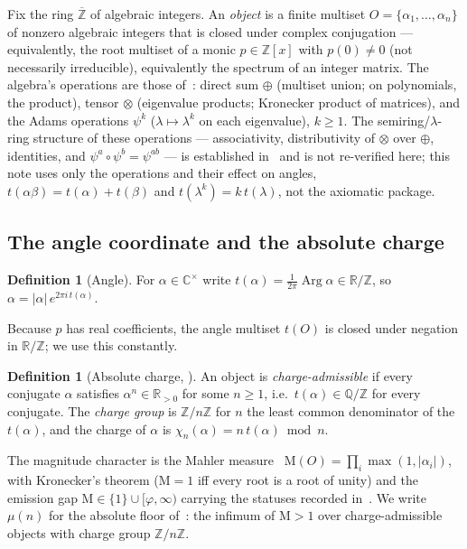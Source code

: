 \documentclass[11pt]{article}
\theoremstyle{plain}
\theoremstyle{definition}
\newtheorem{definition}[theorem]{Definition}
\theoremstyle{remark}
\newcommand{\Q}{\mathbb{Q}}
\newcommand{\Z}{\mathbb{Z}}
\newcommand{\R}{\mathbb{R}}
\newcommand{\Mah}{\mathrm{M}}
\DeclareMathOperator{\Arg}{Arg}
\newcommand{\tors}{\Q/\Z}
\begin{document}
Fix the ring $\overline{\Z}$ of algebraic integers. An \emph{object} is a finite
multiset $O=\{\alpha_1,\dots,\alpha_n\}$ of nonzero algebraic integers that is
closed under complex conjugation --- equivalently, the root multiset of a monic
$p\in\Z[x]$ with $p(0)\neq0$ (not necessarily irreducible), equivalently the
spectrum of an integer matrix. The algebra's operations are those of~\cite{CMC}:
direct sum $\oplus$ (multiset union; on polynomials, the product), tensor
$\otimes$ (eigenvalue products; Kronecker product of matrices), and the Adams
operations $\psi^k$ ($\lambda\mapsto\lambda^k$ on each eigenvalue), $k\ge1$.
The semiring/$\lambda$-ring structure of these operations --- associativity,
distributivity of $\otimes$ over $\oplus$, identities, and
$\psi^a\circ\psi^b=\psi^{ab}$ --- is established in~\cite{CMC} and is not
re-verified here; this note uses only the operations and their effect on
angles, $t(\alpha\beta)=t(\alpha)+t(\beta)$ and $t(\lambda^k)=k\,t(\lambda)$,
not the axiomatic package.

\subsection{The angle coordinate and the absolute charge}

\begin{definition}[Angle]\label{def:angle}
For $\alpha\in\mathbb{C}^\times$ write $t(\alpha)=\frac{1}{2\pi}\Arg\alpha
\in\R/\Z$, so $\alpha=|\alpha|\,e^{2\pi i\,t(\alpha)}$.
\end{definition}

Because $p$ has real coefficients, the angle multiset $t(O)$ is closed under
negation in $\R/\Z$; we use this constantly.

\begin{definition}[Absolute charge, {\cite[Def.~2.4]{CMC}}]\label{def:absolute}
An object is \emph{charge-admissible} if every conjugate $\alpha$ satisfies
$\alpha^n\in\R_{>0}$ for some $n\ge1$, i.e.\ $t(\alpha)\in\tors$ for every
conjugate. The \emph{charge group} is $\Z/n\Z$ for $n$ the least common
denominator of the $t(\alpha)$, and the charge of $\alpha$ is
$\chi_n(\alpha)=n\,t(\alpha)\bmod n$.
\end{definition}

The magnitude character is the Mahler measure~\cite{Mahler}
$\Mah(O)=\prod_i\max(1,|\alpha_i|)$, with Kronecker's theorem ($\Mah=1$ iff every
root is a root of unity) and the emission gap
$\Mah\in\{1\}\cup[\varphi,\infty)$ carrying the statuses recorded
in~\cite[\S2, \S8]{CMC}. We write $\mu(n)$ for the absolute floor of~\cite[Thm.~5.1]{CMC}:
the infimum of $\Mah>1$ over charge-admissible objects with charge group $\Z/n\Z$.
\end{document}
